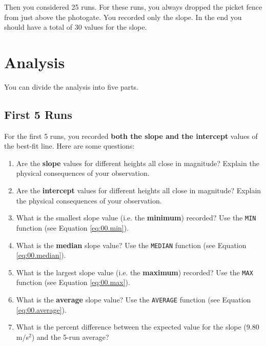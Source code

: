 Then you considered 25 runs. For these runs, you always dropped the picket fence from just above the photogate. You recorded only the slope. In the end you should have a total of 30 values for the slope.
\section{Analysis}
You can divide the analysis into five parts.
\subsection{First 5 Runs} \label{sec:01.first.5}
For the first 5 runs, you recorded \textbf{both the slope and the intercept} values of the best-fit line. Here are some questions:
\begin{enumerate}
    \item Are the \textbf{slope} values for different heights all close in magnitude? Explain the physical consequences of your observation.
    \item Are the \textbf{intercept} values for different heights all close in magnitude? Explain the physical consequences of your observation.
    \item What is the smallest slope value (i.e. the \textbf{minimum}) recorded? Use the \texttt{MIN} function (see Equation \ref{eq:00.min}).
    \item What is the \textbf{median} slope value? Use the \texttt{MEDIAN} function (see Equation \ref{eq:00.median}).
    \item What is the largest slope value (i.e. the \textbf{maximum}) recorded? Use the \texttt{MAX} function (see Equation \ref{eq:00.max}).
    \item What is the \textbf{average} slope value? Use the \texttt{AVERAGE} function (see Equation \ref{eq:00.average}).
    \item What is the percent difference between the expected value for the slope (9.80 m/s$^{2}$) and the 5-run average?
\end{enumerate}

